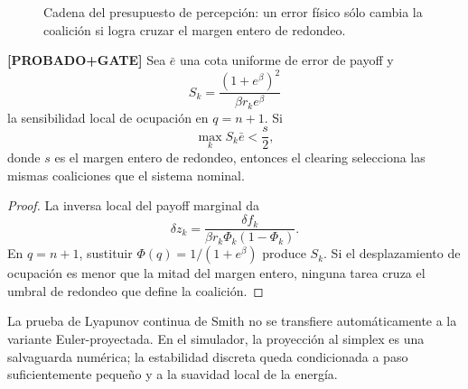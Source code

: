 \begin{figure}[H]
\centering
{}
\caption{Cadena del presupuesto de percepción: un error físico sólo cambia la coalición
si logra cruzar el margen entero de redondeo.}
\label{fig:marco_percepcion}
\end{figure}

\begin{teorema} \textbf{[PROBADO+GATE]}
Sea $\bar e$ una cota uniforme de error de payoff y
\[
  S_k=\frac{(1+e^\beta)^2}{\beta r_ke^\beta}
\]
la sensibilidad local de ocupación en $q=n+1$. Si
\[
  \max_k S_k\bar e < \frac{s}{2},
\]
donde $s$ es el margen entero de redondeo, entonces el clearing selecciona las mismas
coaliciones que el sistema nominal.
\end{teorema}

\begin{proof}
La inversa local del payoff marginal da
\[
  \delta z_k=
  \frac{\delta f_k}{\beta r_k\Phi_k(1-\Phi_k)}.
\]
En $q=n+1$, sustituir $\Phi(q)=1/(1+e^\beta)$ produce $S_k$. Si el desplazamiento de
ocupación es menor que la mitad del margen entero, ninguna tarea cruza el umbral de
redondeo que define la coalición.
\end{proof}

La prueba de Lyapunov continua de Smith no se transfiere automáticamente a la variante
Euler-proyectada. En el simulador, la proyección al simplex es una salvaguarda numérica;
la estabilidad discreta queda condicionada a paso suficientemente pequeño y a la
suavidad local de la energía.

